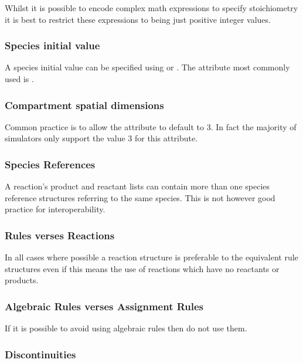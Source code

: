 \documentclass{sbmlfaq}
\begin{document}
Whilst it is possible to encode complex math expressions to specify stoichiometry it is best to restrict these
expressions to being just positive integer values.

\subsubsection{Species initial value}

A species initial value can be specified using  or .
The attribute most commonly used is .

\subsubsection{Compartment spatial dimensions}

Common practice is to allow the  attribute to default to 3.  In fact the majority of simulators
only support the value 3 for this attribute.

\subsubsection{Species References}

A reaction's product and reactant lists can contain more than one species reference structures referring to the same species.
This is not however good practice for interoperability. 

\subsubsection{Rules verses Reactions}

In all cases where possible a reaction structure is preferable to the equivalent rule structures even if this
means the use of reactions which have no reactants or products.

\subsubsection{Algebraic Rules verses Assignment Rules}

If it is possible to avoid using algebraic rules then do not use them.

\subsubsection{Discontinuities}
\end{document}
